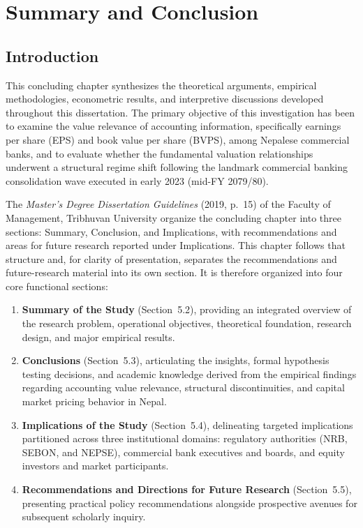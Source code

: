 \chapter{Summary and Conclusion}

\section{Introduction}
This concluding chapter synthesizes the theoretical arguments, empirical methodologies, econometric results, and interpretive discussions developed throughout this dissertation. The primary objective of this investigation has been to examine the value relevance of accounting information, specifically earnings per share (EPS) and book value per share (BVPS), among Nepalese commercial banks, and to evaluate whether the fundamental valuation relationships underwent a structural regime shift following the landmark commercial banking consolidation wave executed in early 2023 (mid-FY 2079/80).

The \textit{Master's Degree Dissertation Guidelines} (2019, p.~15) of the Faculty of Management, Tribhuvan University organize the concluding chapter into three sections: Summary, Conclusion, and Implications, with recommendations and areas for future research reported under Implications. This chapter follows that structure and, for clarity of presentation, separates the recommendations and future-research material into its own section. It is therefore organized into four core functional sections:
\begin{enumerate}
    \item \textbf{Summary of the Study} (Section~5.2), providing an integrated overview of the research problem, operational objectives, theoretical foundation, research design, and major empirical results.
    \item \textbf{Conclusions} (Section~5.3), articulating the insights, formal hypothesis testing decisions, and academic knowledge derived from the empirical findings regarding accounting value relevance, structural discontinuities, and capital market pricing behavior in Nepal.
    \item \textbf{Implications of the Study} (Section~5.4), delineating targeted implications partitioned across three institutional domains: regulatory authorities (NRB, SEBON, and NEPSE), commercial bank executives and boards, and equity investors and market participants.
    \item \textbf{Recommendations and Directions for Future Research} (Section~5.5), presenting practical policy recommendations alongside prospective avenues for subsequent scholarly inquiry.
\end{enumerate}

